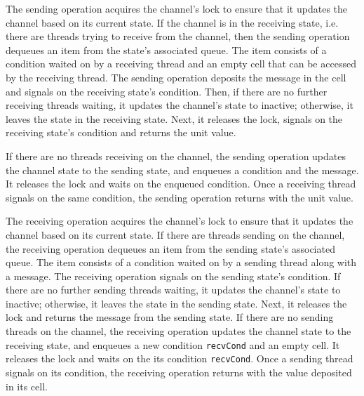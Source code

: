 \documentclass[10pt]{article}
\begin{document}
The sending operation acquires the channel's lock to
ensure that it updates the channel based on
its current state.  If the channel is in the receiving state,
i.e. there are threads trying to receive from the channel,
then the sending operation dequeues an item from the state's associated queue.
The item consists of a condition waited on by a receiving thread and an empty cell
that can be accessed by the receiving thread.
The sending operation deposits the message in the cell and signals on the receiving state's condition.
Then, if there are no further receiving threads waiting, it updates the channel's state to inactive; otherwise,
it leaves the state in the receiving state.
Next, it releases the lock, signals on the receiving state's condition and returns the unit value.

If there are no threads receiving on the
channel, the sending operation updates the channel state to the sending state,
and enqueues a condition and the message.
It releases the lock and waits on the enqueued condition.
Once a receiving thread signals on the same condition,
the sending operation returns with the unit value.

The receiving operation acquires the channel's lock
to ensure that it updates the channel based on
its current state.  If there are threads
sending on the channel, the receiving 
operation dequeues an item from the sending state's associated queue.  The item consists of a condition
waited on by a sending thread along with a message.
The receiving operation signals on the sending state's condition.
If there are no further sending threads waiting, it updates the channel's state to inactive; otherwise,
it leaves the state in the sending state.
Next, it releases the lock and returns the message from the sending state.
If there are no sending threads on the
channel, the receiving operation updates the channel state to the receiving state, and enqueues
a new condition \lstinline{recvCond} and an empty cell.  It releases the lock and waits on
the its condition \lstinline{recvCond}.  Once a sending thread signals on its condition,
the receiving operation returns with the value deposited in its cell.
\end{document}
